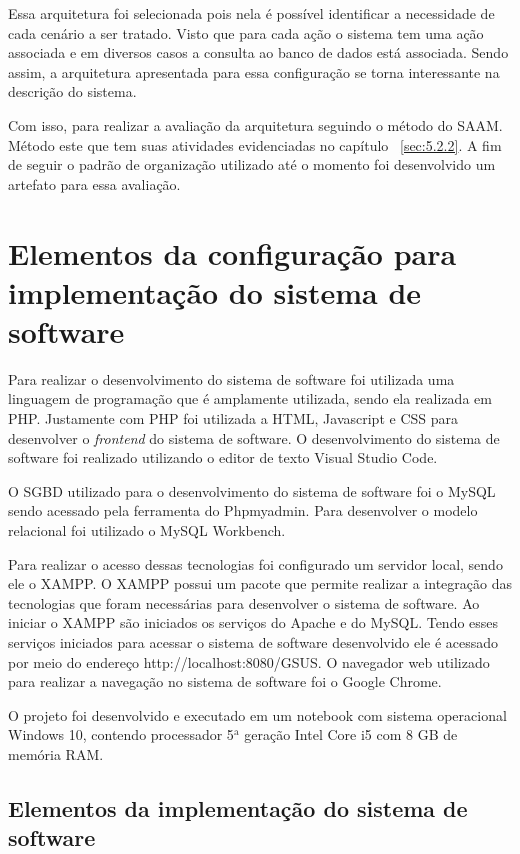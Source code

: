 Essa arquitetura foi selecionada pois nela é possível identificar a necessidade de cada cenário a ser tratado. Visto que para cada ação o sistema tem uma ação associada e em diversos casos a consulta ao banco de dados está associada. Sendo assim, a arquitetura apresentada para essa configuração se torna interessante na descrição do sistema. 

Com isso, para realizar a avaliação da arquitetura seguindo o método do \acrfull{SAAM}. Método este que tem suas atividades evidenciadas no capítulo ~\ref{sec:5.2.2}. A fim de seguir o padrão de organização utilizado até o momento foi desenvolvido um artefato para essa avaliação.

\section{Elementos da configuração para implementação do sistema de software}

Para realizar o desenvolvimento do sistema de software foi utilizada uma linguagem de programação que é amplamente utilizada, sendo ela realizada em PHP. Justamente com PHP foi utilizada a \acrfull{HTML}, Javascript e \acrfull{CSS} para desenvolver o \emph{frontend} do sistema de software. O desenvolvimento do sistema de software foi realizado utilizando o editor de texto Visual Studio Code.

O \acrfull{SGBD} utilizado para o desenvolvimento do sistema de software foi o MySQL sendo acessado pela ferramenta do Phpmyadmin. Para desenvolver o modelo relacional foi utilizado o MySQL Workbench. 

Para realizar o acesso dessas tecnologias foi configurado um servidor local, sendo ele o XAMPP. O XAMPP possui um pacote que permite realizar a integração das tecnologias que foram necessárias para desenvolver o sistema de software.
Ao iniciar o XAMPP são iniciados os serviços do Apache e do MySQL. Tendo esses serviços iniciados para acessar o sistema de software desenvolvido ele é acessado por meio do endereço http://localhost:8080/GSUS. O navegador web utilizado para realizar a navegação no sistema de software foi o Google Chrome.

O projeto foi desenvolvido e executado em um notebook com sistema operacional Windows 10, contendo processador \newcommand{\azinho}{$^{\mathrm a}$} 5$^{\mathrm a}$ geração Intel Core i5 com 8 GB de memória RAM.

\subsection{Elementos da implementação do sistema de software}

